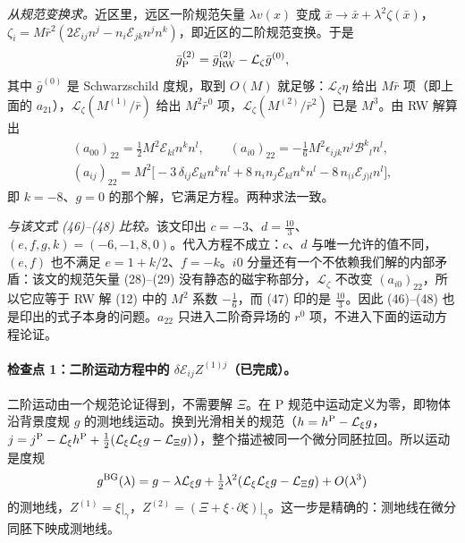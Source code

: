 \documentclass[11pt,a4paper]{ctexart}
\numberwithin{equation}{section}
\begin{document}
\emph{从规范变换求。}近区里，远区一阶规范矢量 $\lambda v(x)$ 变成 $\bar x\to\bar x+\lambda^2\zeta(\bar x)$，$\zeta_i=M\bar r^2(2\mathcal E_{ij}n^j-n_i\mathcal E_{jk}n^jn^k)$，即近区的二阶规范变换。于是
\begin{equation*}
\bar g^{(2)}_{\rm P}=\bar g^{(2)}_{\rm RW}-\mathcal L_\zeta\bar g^{(0)},
\end{equation*}
其中 $\bar g^{(0)}$ 是 Schwarzschild 度规，取到 $O(M)$ 就足够：$\mathcal L_\zeta\eta$ 给出 $M\bar r$ 项（即上面的 $a_{21}$），$\mathcal L_\zeta(M^{(1)}/\bar r)$ 给出 $M^2\bar r^0$ 项，$\mathcal L_\zeta(M^{(2)}/\bar r^2)$ 已是 $M^3$。由 RW 解算出
\begin{gather*}
(a_{00})_{22}=\tfrac12M^2\mathcal E_{kl}n^kn^l,\qquad(a_{i0})_{22}=-\tfrac16M^2\epsilon_{ijk}n^j\mathcal B^k{}_ln^l,\\
(a_{ij})_{22}=M^2\big[-3\,\delta_{ij}\mathcal E_{kl}n^kn^l+8\,n_in_j\mathcal E_{kl}n^kn^l-8\,n_{(i}\mathcal E_{j)l}n^l\big],
\end{gather*}
即 $k=-8$、$g=0$ 的那个解，它满足方程。两种求法一致。

\emph{与该文式 (46)--(48) 比较。}该文印出 $c=-3$、$d=\tfrac{10}{3}$、$(e,f,g,k)=(-6,-1,8,0)$。代入方程不成立：$c$、$d$ 与唯一允许的值不同，$(e,f)$ 也不满足 $e=1+k/2$、$f=-k$。$i0$ 分量还有一个不依赖我们解的内部矛盾：该文的规范矢量 (28)--(29) 没有静态的磁宇称部分，$\mathcal L_\zeta$ 不改变 $(a_{i0})_{22}$，所以它应等于 RW 解 (12) 中的 $M^2$ 系数 $-\tfrac16$，而 (47) 印的是 $\tfrac{10}{3}$。因此 (46)--(48) 也是印出的式子本身的问题。$a_{22}$ 只进入二阶奇异场的 $r^0$ 项，不进入下面的运动方程论证。

\paragraph{检查点 1：二阶运动方程中的 $\delta\mathcal E_{ij}Z^{(1)j}$（已完成）。}二阶运动由一个规范论证得到，不需要解 $\Xi$。在 P 规范中运动定义为零，即物体沿背景度规 $g$ 的测地线运动。换到光滑相关的规范（$h=h^{\rm P}-\mathcal L_\xi g$，$j=j^{\rm P}-\mathcal L_\xi h^{\rm P}+\tfrac12(\mathcal L_\xi\mathcal L_\xi g-\mathcal L_\Xi g)$），整个描述被同一个微分同胚拉回。所以运动是度规
\begin{equation*}
g^{\rm BG}(\lambda)=g-\lambda\mathcal L_\xi g+\tfrac12\lambda^2(\mathcal L_\xi\mathcal L_\xi g-\mathcal L_\Xi g)+O(\lambda^3)
\end{equation*}
的测地线，$Z^{(1)}=\xi|_\gamma$，$Z^{(2)}=(\Xi+\xi\cdot\partial\xi)|_\gamma$。这一步是精确的：测地线在微分同胚下映成测地线。
\end{document}

